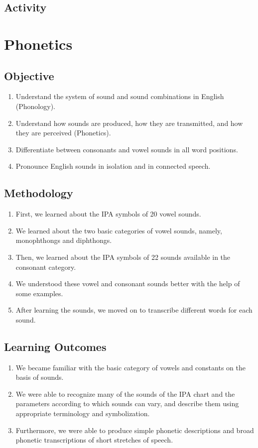 \subsection{Activity}

\pagebreak

\section{Phonetics}
\label{Phonetics}
\subsection{Objective}
\begin{enumerate}
      \item Understand the system of sound and sound combinations in English (Phonology).
      \item Understand how sounds are produced, how they are transmitted, and how they are
            perceived (Phonetics).
      \item Differentiate between consonants and vowel sounds in all word positions.
      \item Pronounce English sounds in isolation and in connected speech.
\end{enumerate}

\subsection{Methodology}
\begin{enumerate}
      \item First, we learned about the IPA symbols of 20 vowel sounds.
      \item We learned about the two basic categories of vowel sounds, namely, monophthongs
            and diphthongs.
      \item Then, we learned about the IPA symbols of 22 sounds available in the consonant
            category.
      \item We understood these vowel and consonant sounds better with the help of some
            examples.
      \item After learning the sounds, we moved on to transcribe different words for each sound.
\end{enumerate}

\subsection{Learning Outcomes}
\begin{enumerate}
      \item We became familiar with the basic category of vowels and constants on the basis of
            sounds.
      \item We were able to recognize many of the sounds of the IPA chart and the parameters
            according to which sounds can vary, and describe them using appropriate terminology
            and symbolization.
      \item Furthermore, we were able to produce simple phonetic descriptions and broad phonetic
            transcriptions of short stretches of speech.
\end{enumerate}

